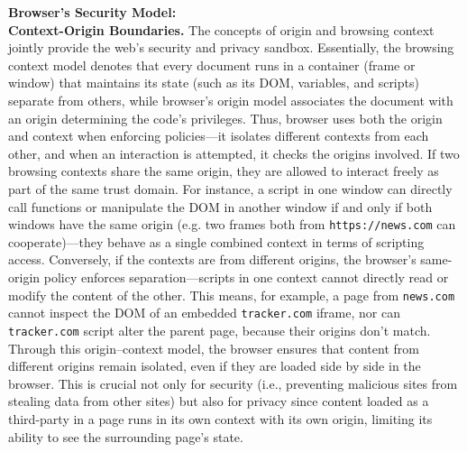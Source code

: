 \noindent \textbf{Browser's Security Model:}\\ 
\noindent \textbf{Context-Origin Boundaries.}  
%
The concepts of origin and browsing context jointly provide the web’s security and privacy sandbox. 
%
Essentially, the browsing context model denotes that every document runs in a container (frame or window) that maintains its state (such as its DOM, variables, and scripts) separate from others, while browser's origin model associates the document with an origin determining the code’s privileges.
%
Thus, browser uses both the origin and context when enforcing policies---it isolates different contexts from each other, and when an interaction is attempted, it checks the origins involved. 
%
If two browsing contexts share the same origin, they are allowed to interact freely as part of the same trust domain. 
%
For instance, a script in one window can directly call functions or manipulate the DOM in another window if and only if both windows have the same origin (e.g. two frames both from \texttt{https://news.com} can cooperate)---they behave as a single combined context in terms of scripting access. 
%
Conversely, if the contexts are from different origins, the browser’s same-origin policy enforces separation---scripts in one context cannot directly read or modify the content of the other.
%
This means, for example, a page from \texttt{news.com} cannot inspect the DOM of an embedded \texttt{tracker.com} iframe, nor can \texttt{tracker.com} script alter the parent page, because their origins don’t match.
%
Through this origin–context model, the browser ensures that content from different origins remain isolated, even if they are loaded side by side in the browser. 
%
This is crucial not only for security (i.e., preventing malicious sites from stealing data from other sites) but also for privacy since content loaded as a third-party in a page runs in its own context with its own origin, limiting its ability to see the surrounding page’s state.




